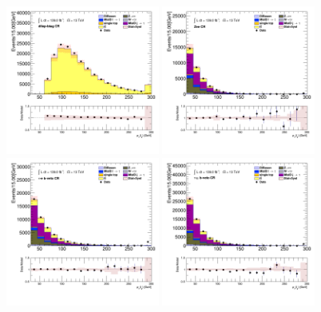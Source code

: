 		\begin{figure}[!htp]
			\begin{center}    
			\includegraphics[width=0.45\textwidth]{chapters/chapter6_HPlus/images/taulep/lep_0_pt_DILEP_BTAG.png}
			\includegraphics[width=0.45\textwidth]{chapters/chapter6_HPlus/images/taulep/lep_0_pt_ZEE.png} \\
			\includegraphics[width=0.45\textwidth]{chapters/chapter6_HPlus/images/taulep/lep_0_pt_TAUEL_BVETO.png} 
			\includegraphics[width=0.45\textwidth]{chapters/chapter6_HPlus/images/taulep/lep_0_pt_TAUMU_BVETO.png} \\

\end{center}
\end{figure}
